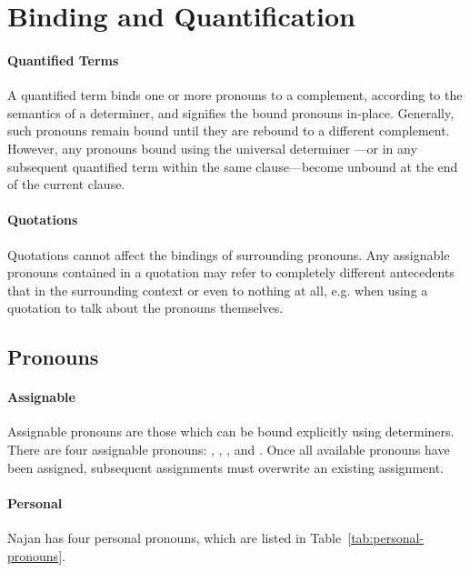 \section{Binding and Quantification} \label{sec:binding}

\paragraph{Quantified Terms} A quantified term binds one or more pronouns to a
complement, according to the semantics of a determiner, and signifies the bound
pronouns in-place. Generally, such pronouns remain bound until they are rebound
to a different complement. However, any pronouns bound using the universal
determiner ---or in any subsequent quantified term within the same
clause---become unbound at the end of the current clause.



\paragraph{Quotations} Quotations cannot affect the bindings of surrounding
pronouns. Any assignable pronouns contained in a quotation may refer to
completely different antecedents that in the surrounding context or even to
nothing at all, e.g. when using a quotation to talk about the pronouns
themselves.

\subsection{Pronouns} \label{sec:pronouns}

\paragraph{Assignable} Assignable pronouns are those which can be bound
explicitly using determiners. There are four assignable pronouns: ,
, , and . Once all available pronouns have been
assigned, subsequent assignments must overwrite an existing assignment.

\paragraph{Personal} Najan has four personal pronouns, which are listed in
Table~\ref{tab:personal-pronouns}.


